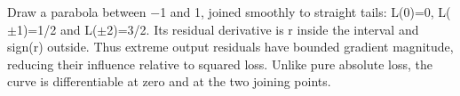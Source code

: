 Draw a parabola between \ensuremath{-}1 and 1, joined smoothly to straight tails: L(0)=0, L(\ensuremath{\pm}1)=1/2 and L(\ensuremath{\pm}2)=3/2. Its residual derivative is r inside the interval and sign(r) outside. Thus extreme output residuals have bounded gradient magnitude, reducing their influence relative to squared loss. Unlike pure absolute loss, the curve is differentiable at zero and at the two joining points.

